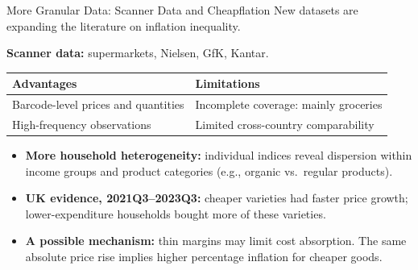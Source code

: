 \documentclass[11pt,aspectratio=169]{beamer}
\begin{document}
\begin{frame}{More Granular Data: Scanner Data and Cheapflation}
\small
New datasets are expanding the literature on inflation inequality.
\par\vspace{.5em}
\textbf{Scanner data:} supermarkets, Nielsen, GfK, Kantar.
\par\vspace{.4em}
\begin{tabular}{@{}p{}p{}@{}}
\toprule
\textbf{Advantages} & \textbf{Limitations}\\
\midrule
Barcode-level prices and quantities & Incomplete coverage: mainly groceries\\[.25em]
High-frequency observations & Limited cross-country comparability\\
\bottomrule
\end{tabular}
\par\vspace{.5em}
\begin{itemize}
\setlength{\itemsep}{.3em}
\item \textbf{More household heterogeneity:} individual indices reveal dispersion within income groups and product categories (e.g., organic vs.\ regular products).
\item \textbf{UK evidence, 2021Q3--2023Q3:} cheaper varieties had faster price growth; lower-expenditure households bought more of these varieties.
\item \textbf{A possible mechanism:} thin margins may limit cost absorption. The same absolute price rise implies higher percentage inflation for cheaper goods.
\end{itemize}
\end{frame}
\end{document}
